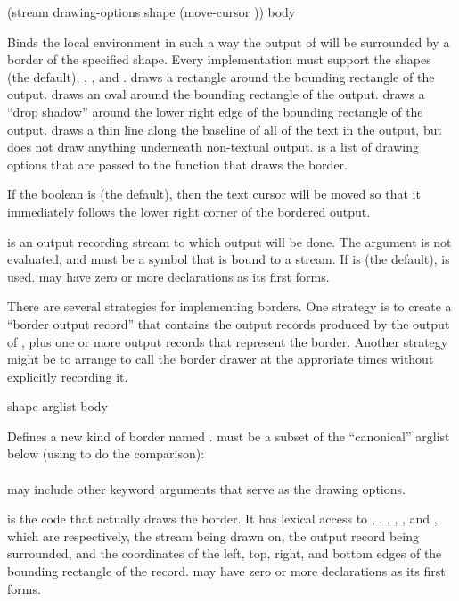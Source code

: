  {(\optional stream
                                             \rest drawing-options
                                             \key shape (move-cursor ))
                                            \body body}

Binds the local environment in such a way the output of  will be
surrounded by a border of the specified shape.  Every implementation must
support the shapes  (the default), , ,
and .   draws a rectangle around the bounding
rectangle of the output.   draws an oval around the bounding rectangle
of the output.   draws a ``drop shadow'' around the lower right
edge of the bounding rectangle of the output.   draws a thin line
along the baseline of all of the text in the output, but does not draw anything
underneath non-textual output.   is a list of drawing
options that are passed to the function that draws the border.

If the boolean  is  (the default), then the text
cursor will be moved so that it immediately follows the lower right corner of
the bordered output.

 is an output recording stream to which output will be done.
The  argument is not evaluated, and must be a symbol that is
bound to a stream.  If  is  (the default),
 is used.   may have zero or more
declarations as its first forms.

There are several strategies for implementing borders.  One strategy is to
create a ``border output record'' that contains the output records produced by
the output of , plus one or more output records that represent the
border.  Another strategy might be to arrange to call the border drawer at the
approriate times without explicitly recording it.


 {shape arglist \body body}

Defines a new kind of border named .   must be a subset
of the ``canonical'' arglist below (using  to do the
comparison):
\\
\\

 may include other keyword arguments that serve as the drawing options.

 is the code that actually draws the border.  It has lexical access to
, , , , , and ,
which are respectively, the stream being drawn on, the output record being
surrounded, and the coordinates of the left, top, right, and bottom edges of the
bounding rectangle of the record.   may have zero or more declarations
as its first forms.
